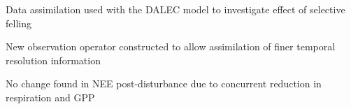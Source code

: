 \documentclass[draft,linenumbers]{agujournal}
\begin{document}







\begin{keypoints}
\item Data assimilation used with the DALEC model to investigate effect of selective felling
\item New observation operator constructed to allow assimilation of finer temporal resolution information 
\item No change found in NEE post-disturbance due to concurrent reduction in respiration and GPP 
\end{keypoints}

%
%

\end{document}
